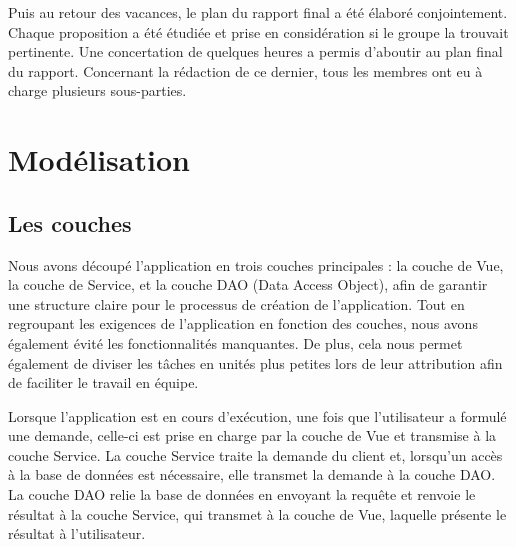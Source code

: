 \documentclass[11pt]{article}
\begin{document}
Puis au retour des vacances, le plan du rapport final a été élaboré conjointement. Chaque proposition a été étudiée et prise en considération si le groupe la trouvait pertinente. Une concertation de quelques heures a permis d’aboutir au plan final du rapport. Concernant la rédaction de ce dernier, tous les membres ont eu à charge plusieurs sous-parties.



\newpage
\section{Modélisation}

\subsection{Les couches}

Nous avons découpé l'application en trois couches principales : la couche de Vue, la couche de Service, et la couche DAO (Data Access Object), afin de garantir une structure claire pour le processus de création de l'application. Tout en regroupant les exigences de l'application en fonction des couches, nous avons également évité les fonctionnalités manquantes. De plus, cela nous permet également de diviser les tâches en unités plus petites lors de leur attribution afin de faciliter le travail en équipe.

Lorsque l'application est en cours d'exécution, une fois que l'utilisateur a formulé une demande, celle-ci est prise en charge par la couche de Vue et transmise à la couche Service. La couche Service traite la demande du client et, lorsqu'un accès à la base de données est nécessaire, elle transmet la demande à la couche DAO. La couche DAO relie la base de données en envoyant la requête et renvoie le résultat à la couche Service, qui transmet à la couche de Vue, laquelle présente le résultat à l'utilisateur.
\end{document}
